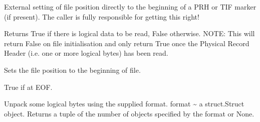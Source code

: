 \documentclass[letterpaper,10pt,english]{sphinxmanual}
\begin{document}
\begin{fulllineitems}
\begin{fulllineitems}
\end{fulllineitems}


\begin{fulllineitems}
\label{\detokenize{ref/LIS/core/File:TotalDepth.LIS.core.File.FileRead.seekLr}}
External setting of file position directly to the beginning of
a PRH or TIF marker (if present). The caller is fully responsible
for getting this right!

\end{fulllineitems}


\begin{fulllineitems}
\label{\detokenize{ref/LIS/core/File:TotalDepth.LIS.core.File.FileRead.hasLd}}
Returns True if there is logical data to be read, False otherwise.
NOTE: This will return False on file initialisation and only return
True once the Physical Record Header (i.e. one or more logical bytes)
has been read.

\end{fulllineitems}


\begin{fulllineitems}
\label{\detokenize{ref/LIS/core/File:TotalDepth.LIS.core.File.FileRead.rewind}}
Sets the file position to the beginning of file.

\end{fulllineitems}


\begin{fulllineitems}
\label{\detokenize{ref/LIS/core/File:TotalDepth.LIS.core.File.FileRead.isEOF}}
True if at EOF.

\end{fulllineitems}


\begin{fulllineitems}
\label{\detokenize{ref/LIS/core/File:TotalDepth.LIS.core.File.FileRead.unpack}}
Unpack some logical bytes using the supplied format.
format \textasciitilde{} a struct.Struct object.
Returns a tuple of the number of objects specified by the format or None.

\end{fulllineitems}


\end{fulllineitems}
\end{document}
